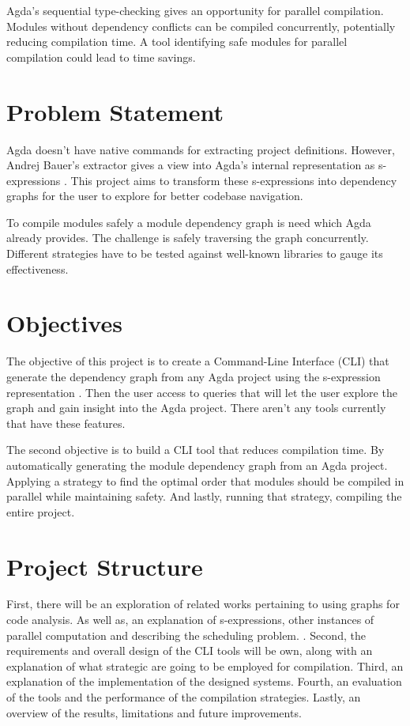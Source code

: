 Agda's sequential type-checking gives an opportunity for parallel compilation.
Modules without dependency conflicts can be compiled concurrently, potentially
reducing compilation time. A tool identifying safe modules for parallel
compilation could lead to time savings.

\section{Problem Statement}

Agda doesn't have native commands for extracting project definitions. However,
Andrej Bauer's extractor gives a view into Agda's internal representation as
s-expressions \cite{andrej}. This project aims to transform these s-expressions
into dependency graphs for the user to explore for better codebase navigation.

To compile modules safely a module dependency graph is need which Agda already
provides. The challenge is safely traversing the graph concurrently. Different
strategies have to be tested against well-known libraries to gauge its
effectiveness. 

\section{Objectives}

The objective of this project is to create a Command-Line Interface (CLI) that
generate the dependency graph from any Agda project using the s-expression
representation \cite{andrej}. Then the user access to queries that will let the
user explore the graph and gain insight into the Agda project. There aren't
any tools currently that have these features. 

The second objective is to build a CLI tool that reduces compilation time. By
automatically generating the module dependency graph from an Agda project.
Applying a strategy to find the optimal order that modules should be compiled
in parallel while maintaining safety. And lastly, running that strategy,
compiling the entire project.

\section{Project Structure}

First, there will be an exploration of related works pertaining to using graphs
for code analysis. As well as, an explanation of s-expressions, other instances
of parallel computation and describing the scheduling problem. . Second, the requirements
and overall design of the CLI tools will be own, along with an explanation of
what strategic are going to be employed for compilation. Third, an explanation
of the implementation of the designed systems. Fourth, an evaluation of the
tools and the performance of the compilation strategies. Lastly, an overview of
the results, limitations and future improvements.
